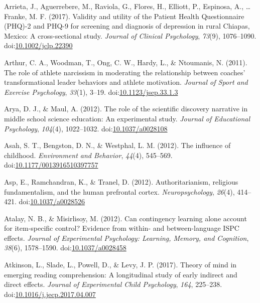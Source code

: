\documentclass[english,man]{apa6}
\begin{document}
\hypertarget{ref-Arrieta2017}{}
Arrieta, J., Aguerrebere, M., Raviola, G., Flores, H., Elliott, P.,
Espinosa, A., \ldots{} Franke, M. F. (2017). Validity and utility of the
Patient Health Questionnaire (PHQ)-2 and PHQ-9 for screening and
diagnosis of depression in rural Chiapas, Mexico: A cross-sectional
study. \emph{Journal of Clinical Psychology}, \emph{73}(9), 1076--1090.
doi:\href{https://doi.org/10.1002/jclp.22390}{10.1002/jclp.22390}

\hypertarget{ref-Arthur2011}{}
Arthur, C. A., Woodman, T., Ong, C. W., Hardy, L., \& Ntoumanis, N.
(2011). The role of athlete narcissism in moderating the relationship
between coaches' transformational leader behaviors and athlete
motivation. \emph{Journal of Sport and Exercise Psychology},
\emph{33}(1), 3--19.
doi:\href{https://doi.org/10.1123/jsep.33.1.3}{10.1123/jsep.33.1.3}

\hypertarget{ref-Arya2012}{}
Arya, D. J., \& Maul, A. (2012). The role of the scientific discovery
narrative in middle school science education: An experimental study.
\emph{Journal of Educational Psychology}, \emph{104}(4), 1022--1032.
doi:\href{https://doi.org/10.1037/a0028108}{10.1037/a0028108}

\hypertarget{ref-Asah2012}{}
Asah, S. T., Bengston, D. N., \& Westphal, L. M. (2012). The influence
of childhood. \emph{Environment and Behavior}, \emph{44}(4), 545--569.
doi:\href{https://doi.org/10.1177/0013916510397757}{10.1177/0013916510397757}

\hypertarget{ref-Asp2012}{}
Asp, E., Ramchandran, K., \& Tranel, D. (2012). Authoritarianism,
religious fundamentalism, and the human prefrontal cortex.
\emph{Neuropsychology}, \emph{26}(4), 414--421.
doi:\href{https://doi.org/10.1037/a0028526}{10.1037/a0028526}

\hypertarget{ref-Atalay2012}{}
Atalay, N. B., \& Misirlisoy, M. (2012). Can contingency learning alone
account for item-specific control? Evidence from within- and
between-language ISPC effects. \emph{Journal of Experimental Psychology:
Learning, Memory, and Cognition}, \emph{38}(6), 1578--1590.
doi:\href{https://doi.org/10.1037/a0028458}{10.1037/a0028458}

\hypertarget{ref-Atkinson2017}{}
Atkinson, L., Slade, L., Powell, D., \& Levy, J. P. (2017). Theory of
mind in emerging reading comprehension: A longitudinal study of early
indirect and direct effects. \emph{Journal of Experimental Child
Psychology}, \emph{164}, 225--238.
doi:\href{https://doi.org/10.1016/j.jecp.2017.04.007}{10.1016/j.jecp.2017.04.007}
\end{document}
